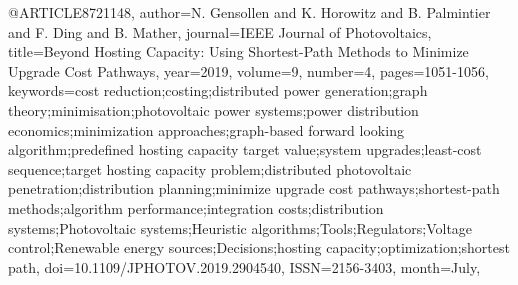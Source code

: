 @ARTICLE{8721148, 
author={N. {Gensollen} and K. {Horowitz} and B. {Palmintier} and F. {Ding} and B. {Mather}}, 
journal={IEEE Journal of Photovoltaics}, 
title={Beyond Hosting Capacity: Using Shortest-Path Methods to Minimize Upgrade Cost Pathways}, 
year={2019}, 
volume={9}, 
number={4}, 
pages={1051-1056}, 
keywords={cost reduction;costing;distributed power generation;graph theory;minimisation;photovoltaic power systems;power distribution economics;minimization approaches;graph-based forward looking algorithm;predefined hosting capacity target value;system upgrades;least-cost sequence;target hosting capacity problem;distributed photovoltaic penetration;distribution planning;minimize upgrade cost pathways;shortest-path methods;algorithm performance;integration costs;distribution systems;Photovoltaic systems;Heuristic algorithms;Tools;Regulators;Voltage control;Renewable energy sources;Decisions;hosting capacity;optimization;shortest path}, 
doi={10.1109/JPHOTOV.2019.2904540}, 
ISSN={2156-3403}, 
month={July},}
